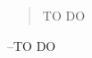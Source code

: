 \documentclass[letterpaper, landscape]{exam}
\begin{document}
\begin{description}
\begin{enumerate}[(a)]
      \end{enumerate}







  \end{description}

  \else
    \vspace{10 cm}
    \begin{quote}
      \begin{em}
        TO DO
      \end{em}
    \end{quote}
    \hspace{2 cm} --TO DO
  \fi
\end{document}
